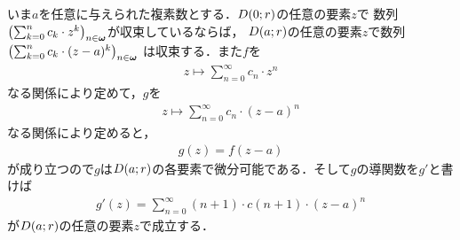 	いま$a$を任意に与えられた複素数とする．$D(0;r)$の任意の要素$z$で
	数列$\left(\sum_{k=0}^{n} c_{k} \cdot z^{k}\right)_{n \in {\boldsymbol \omega}}$が収束しているならば，
	$D(a;r)$の任意の要素$z$で数列$\left(\sum_{k=0}^{n} c_{k} \cdot (z-a)^{k}\right)_{n \in {\boldsymbol \omega}}$
	は収束する．また$f$を
	\begin{align}
		z \longmapsto \sum_{n=0}^{\infty} c_{n} \cdot z^{n}
	\end{align}
	なる関係により定めて，$g$を
	\begin{align}
		z \longmapsto \sum_{n=0}^{\infty} c_{n} \cdot (z-a)^{n}
	\end{align}
	なる関係により定めると，
	\begin{align}
		g(z) = f(z-a)
	\end{align}
	が成り立つので$g$は$D(a;r)$の各要素で微分可能である．そして$g$の導関数を$g'$と書けば
	\begin{align}
		g'(z) = \sum_{n=0}^{\infty} (n+1) \cdot c(n+1) \cdot (z-a)^{n}
	\end{align}
	が$D(a;r)$の任意の要素$z$で成立する．